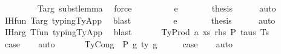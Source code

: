 \begin{isabellebody}
\ \ \ \ \ \ \isamarkupfalse%
\ {\isachardoublequoteopen}{}{\isachardoublequoteclose}{\isacharparenleft}{\kern0pt}{}{\isacharcomma}{\kern0pt}{}{\isacharcomma}{\kern0pt}{}{\isacharcomma}{\kern0pt}{}{\isacharparenright}{\kern0pt}\ T{\isacharunderscore}{\kern0pt}arg\ subst{\isacharunderscore}{\kern0pt}lemma\ \isamarkupfalse%
\ force\isanewline
\ \ \isamarkupfalse%
\isanewline
\ \ \ \ \isamarkupfalse%
\ {\isacharparenleft}{\kern0pt}{}\ e{}{\isacharprime}{\kern0pt}{\isacharparenright}{\kern0pt}\isanewline
\ \ \ \ \isamarkupfalse%
\ \isamarkupfalse%
\ {\isacharquery}{\kern0pt}thesis\isanewline
\ \ \ \ \isamarkupfalse%
\ auto\isanewline
\ \ \ \ \isamarkupfalse%
\ IH{\isacharunderscore}{\kern0pt}fun\ T{\isacharunderscore}{\kern0pt}arg\ typing{\isachardot}{\kern0pt}TyApp\ \isamarkupfalse%
\ blast\isanewline
\ \ \isamarkupfalse%
\isanewline
\ \ \ \ \isamarkupfalse%
\ {\isacharparenleft}{\kern0pt}{}\ e{\isacharprime}{\kern0pt}{\isacharparenright}{\kern0pt}\isanewline
\ \ \ \ \isamarkupfalse%
\ \isamarkupfalse%
\ {\isacharquery}{\kern0pt}thesis\isanewline
\ \ \ \ \isamarkupfalse%
\ auto\isanewline
\ \ \ \ \isamarkupfalse%
\ IH{\isacharunderscore}{\kern0pt}arg\ T{\isacharunderscore}{\kern0pt}fun\ typing{\isachardot}{\kern0pt}TyApp\ \isamarkupfalse%
\ blast\isanewline
\ \ \isamarkupfalse%
\isanewline
{}\isamarkupfalse%
\isanewline
\ \ \isamarkupfalse%
\ {\isacharparenleft}{\kern0pt}TyProd\ a\ xs\ rhs\ P\ taus\ Ts\ {\isasymGamma}{\isacharparenright}{\kern0pt}\isanewline
\ \ \isamarkupfalse%
\ \isamarkupfalse%
\ {\isacharquery}{\kern0pt}case\isanewline
\ \ \isamarkupfalse%
\ auto\isanewline
\ \ \isamarkupfalse%
\isanewline
{}\isamarkupfalse%
\isanewline
\ \ \isamarkupfalse%
\ {\isacharparenleft}{\kern0pt}TyCong\ {\isasymGamma}\ P\ g{}\ ty\ g{}{\isacharparenright}{\kern0pt}\isanewline
\ \ \isamarkupfalse%
\ \isamarkupfalse%
\ {\isacharquery}{\kern0pt}case\isanewline
\ \ \isamarkupfalse%
\ auto\isanewline

\end{isabellebody}
